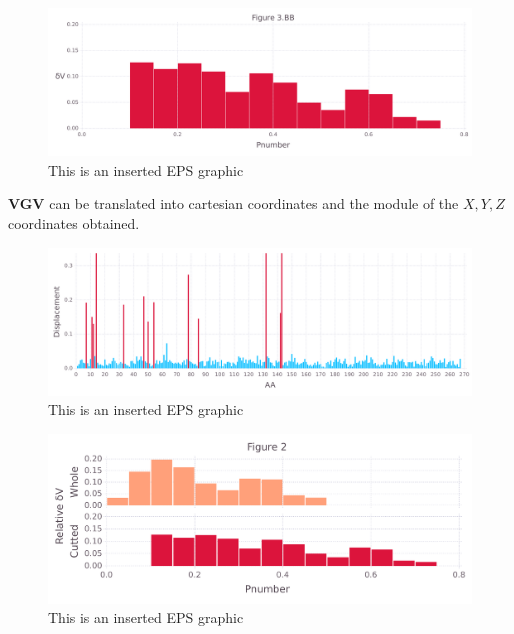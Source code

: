 \documentclass[10pt,letterpaper]{article}
\begin{document}
\begin{figure}[ht]
\begin{center}
\includegraphics[scale=0.5]{1m14/3bbfigure_hi-precision.pdf}
\caption{This is an inserted EPS graphic}
\label{fig11}
\end{center}
\end{figure}

\FloatBarrier


\textbf{VGV} can be translated into cartesian coordinates and the module of the \(X, Y, Z\) coordinates obtained.

\begin{figure}[ht]
\begin{center}
\includegraphics[scale=0.5]{1m14/5figure_hi-precision.pdf}
\caption{This is an inserted EPS graphic}
\label{fig13}
\end{center}
\end{figure}

\begin{figure}[ht]
\begin{center}
\includegraphics[scale=0.5]{1m14/3both_figure_hi-precision.pdf}
\caption{This is an inserted EPS graphic}
\label{fig13}
\end{center}
\end{figure}
\end{document}

